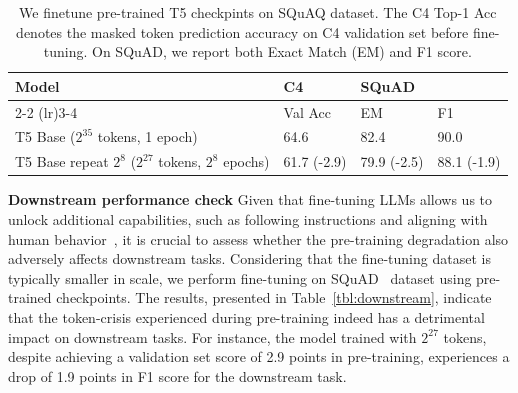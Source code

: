 \documentclass{article}
\begin{document}
\begin{table}[t]
\small
\caption{We finetune pre-trained T5 checkpints on SQuAQ\citep{rajpurkar-etal-2016-squad} dataset. The C4 Top-1 Acc denotes the masked token prediction accuracy on C4 validation set before fine-tuning. On SQuAD, we report both Exact Match (EM) and F1 score.}
\vspace{5pt}
\centering
\begin{tabular}{l l ll }
\toprule 
Model      &     C4      & \multicolumn{2}{l}{SQuAD} \\  \cmidrule(lr){2-2} \cmidrule(lr){3-4} 
                & Val Acc & EM & F1  \\ \midrule
T5 Base ($2^{35}$ tokens, 1 epoch)       & 64.6      & 82.4   & 90.0       \\ 
T5 Base repeat $2^{8}$  ($2^{27}$ tokens, $2^{8}$ epochs)  &61.7 (-2.9)       & 79.9 (-2.5)  & 88.1 (-1.9)   \\ \bottomrule
\end{tabular}
\label{tbl:downstream-std}
\end{table}




\textbf{Downstream performance check} Given that fine-tuning LLMs allows us to unlock additional capabilities, such as following instructions and aligning with human behavior~\citep{NEURIPS2022_b1efde53}, it is crucial to assess whether the pre-training degradation also adversely affects downstream tasks. Considering that the fine-tuning dataset is typically smaller in scale, we perform fine-tuning on SQuAD~\citep{rajpurkar-etal-2016-squad} dataset using pre-trained checkpoints.
The results, presented in Table~\ref{tbl:downstream}, indicate that the token-crisis experienced during pre-training indeed has a detrimental impact on downstream tasks. For instance, the model trained with $2^{27}$ tokens, despite achieving a validation set score of 2.9 points in pre-training, experiences a drop of 1.9 points in F1 score for the downstream task.
\end{document}
